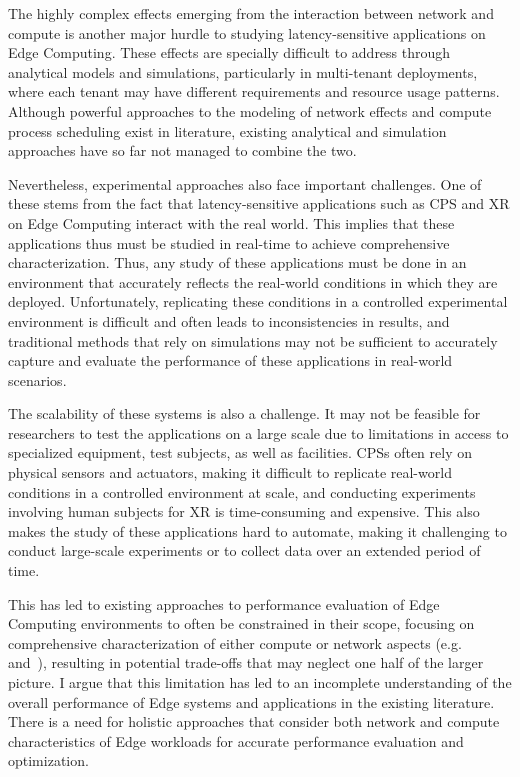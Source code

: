 The highly complex effects emerging from the interaction between network and compute is another major hurdle to studying latency-sensitive applications on Edge Computing.
These effects are specially difficult to address through analytical models and simulations, particularly in multi-tenant deployments, where each tenant may have different requirements and resource usage patterns.
Although powerful approaches to the modeling of network effects and compute process scheduling exist in literature, existing analytical and simulation approaches have so far not managed to combine the two.

Nevertheless, experimental approaches also face important challenges.
One of these stems from the fact that latency-sensitive applications such as \gls{CPS} and \gls{XR} on Edge Computing interact with the real world.
This implies that these applications thus must be studied in real-time to achieve comprehensive characterization.
Thus, any study of these applications must be done in an environment that accurately reflects the real-world conditions in which they are deployed.
Unfortunately, replicating these conditions in a controlled experimental environment is difficult and often leads to inconsistencies in results, and traditional methods that rely on simulations may not be sufficient to accurately capture and evaluate the performance of these applications in real-world scenarios.

The scalability of these systems is also a challenge.
It may not be feasible for researchers to test the applications on a large scale due to limitations in access to specialized equipment, test subjects, as well as facilities.
\glspl{CPS} often rely on physical sensors and actuators, making it difficult to replicate real-world conditions in a controlled environment at scale, and conducting experiments involving human subjects for \gls{XR} is time-consuming and expensive.
This also makes the study of these applications hard to automate, making it challenging to conduct large-scale experiments or to collect data over an extended period of time.

This has led to existing approaches to performance evaluation of Edge Computing environments to often be constrained in their scope, focusing on comprehensive characterization of either compute or network aspects (e.g.~\cite{chen2015efficient} and~\cite{al2017reliable}), resulting in potential trade-offs that may neglect one half of the larger picture.
I argue that this limitation has led to an incomplete understanding of the overall performance of Edge systems and applications in the existing literature.
There is a need for holistic approaches that consider both network and compute characteristics of Edge workloads for accurate performance evaluation and optimization.

